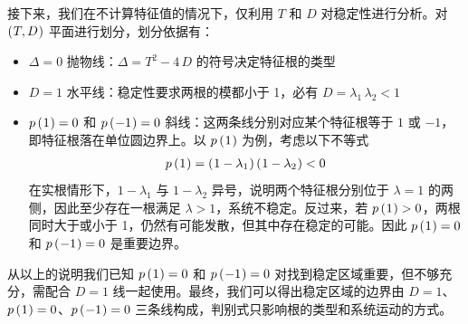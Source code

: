 接下来，我们在不计算特征值的情况下，仅利用 \(T\) 和 \(D\) 对稳定性进行分析。对 \(\bka{T,D}\) 平面进行划分，划分依据有：
\begin{itemize}
    \item \(\Delta=0\) 抛物线：\(\Delta=T^2-4\,D\) 的符号决定特征根的类型
    \item \(D=1\) 水平线：稳定性要求两根的模都小于 1，必有 \(D=\lambda_1\,\lambda_2<1\)
    \item \(p\bka{1}=0\) 和 \(p\bka{-1}=0\) 斜线：这两条线分别对应某个特征根等于 \(1\) 或 \(-1\)，即特征根落在单位圆边界上。以 \(p\bka{1}\) 为例，考虑以下不等式
    \begin{align*}
        p\bka 1=\bka{1-\lambda_1}\bka{1-\lambda_2}<0
    \end{align*}
    在实根情形下，\(1-\lambda_1\) 与 \(1-\lambda_2\) 异号，说明两个特征根分别位于 \(\lambda=1\) 的两侧，因此至少存在一根满足 \(\lambda>1\)，系统不稳定。反过来，若 \(p\bka 1>0\)，两根同时大于或小于 1，仍然有可能发散，但其中存在稳定的可能。因此 \(p\bka{1}=0\) 和 \(p\bka{-1}=0\) 是重要边界。
\end{itemize}
从以上的说明我们已知 \(p\bka{1}=0\) 和 \(p\bka{-1}=0\) 对找到稳定区域重要，但不够充分，需配合 \(D=1\) 线一起使用。最终，我们可以得出稳定区域的边界由 \(D=1\)、\(p\bka{1}=0\)、\(p\bka{-1}=0\) 三条线构成，判别式只影响根的类型和系统运动的方式。


